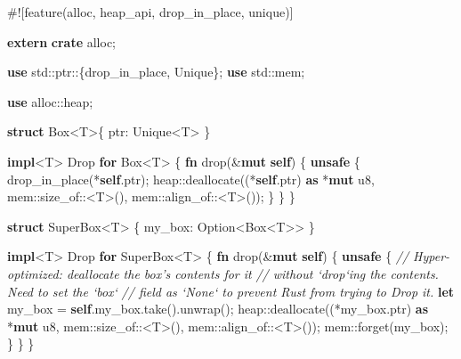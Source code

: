 \documentclass[a4paper,]{book}
\newenvironment{Shaded}{\begin{snugshade}}{\end{snugshade}}
\newcommand{\KeywordTok}[1]{\textcolor[rgb]{0.13,0.29,0.53}{\textbf{{#1}}}}
\newcommand{\DataTypeTok}[1]{\textcolor[rgb]{0.13,0.29,0.53}{{#1}}}
\newcommand{\CommentTok}[1]{\textcolor[rgb]{0.56,0.35,0.01}{\textit{{#1}}}}
\newcommand{\BuiltInTok}[1]{{#1}}
\newcommand{\AttributeTok}[1]{\textcolor[rgb]{0.77,0.63,0.00}{{#1}}}
\newcommand{\NormalTok}[1]{{#1}}
\begin{document}
\begin{Shaded}
\begin{Highlighting}[]
\AttributeTok{#![}\NormalTok{feature}\AttributeTok{(}\NormalTok{alloc}\AttributeTok{,} \NormalTok{heap_api}\AttributeTok{,} \NormalTok{drop_in_place}\AttributeTok{,} \NormalTok{unique}\AttributeTok{)]}

\KeywordTok{extern} \KeywordTok{crate} \NormalTok{alloc;}

\KeywordTok{use} \NormalTok{std::ptr::\{drop_in_place, Unique\};}
\KeywordTok{use} \NormalTok{std::mem;}

\KeywordTok{use} \NormalTok{alloc::heap;}

\KeywordTok{struct} \DataTypeTok{Box}\NormalTok{<T>\{ ptr: Unique<T> \}}

\KeywordTok{impl}\NormalTok{<T> }\BuiltInTok{Drop} \KeywordTok{for} \DataTypeTok{Box}\NormalTok{<T> \{}
    \KeywordTok{fn} \NormalTok{drop(&}\KeywordTok{mut} \KeywordTok{self}\NormalTok{) \{}
        \KeywordTok{unsafe} \NormalTok{\{}
            \NormalTok{drop_in_place(*}\KeywordTok{self}\NormalTok{.ptr);}
            \NormalTok{heap::deallocate((*}\KeywordTok{self}\NormalTok{.ptr) }\KeywordTok{as} \NormalTok{*}\KeywordTok{mut} \DataTypeTok{u8}\NormalTok{,}
                             \NormalTok{mem::size_of::<T>(),}
                             \NormalTok{mem::align_of::<T>());}
        \NormalTok{\}}
    \NormalTok{\}}
\NormalTok{\}}

\KeywordTok{struct} \NormalTok{SuperBox<T> \{ my_box: }\DataTypeTok{Option}\NormalTok{<}\DataTypeTok{Box}\NormalTok{<T>> \}}

\KeywordTok{impl}\NormalTok{<T> }\BuiltInTok{Drop} \KeywordTok{for} \NormalTok{SuperBox<T> \{}
    \KeywordTok{fn} \NormalTok{drop(&}\KeywordTok{mut} \KeywordTok{self}\NormalTok{) \{}
        \KeywordTok{unsafe} \NormalTok{\{}
            \CommentTok{// Hyper-optimized: deallocate the box's contents for it}
            \CommentTok{// without `drop`ing the contents. Need to set the `box`}
            \CommentTok{// field as `None` to prevent Rust from trying to Drop it.}
            \KeywordTok{let} \NormalTok{my_box = }\KeywordTok{self}\NormalTok{.my_box.take().unwrap();}
            \NormalTok{heap::deallocate((*my_box.ptr) }\KeywordTok{as} \NormalTok{*}\KeywordTok{mut} \DataTypeTok{u8}\NormalTok{,}
                             \NormalTok{mem::size_of::<T>(),}
                             \NormalTok{mem::align_of::<T>());}
            \NormalTok{mem::forget(my_box);}
        \NormalTok{\}}
    \NormalTok{\}}
\NormalTok{\}}
\end{Highlighting}
\end{Shaded}
\end{document}
